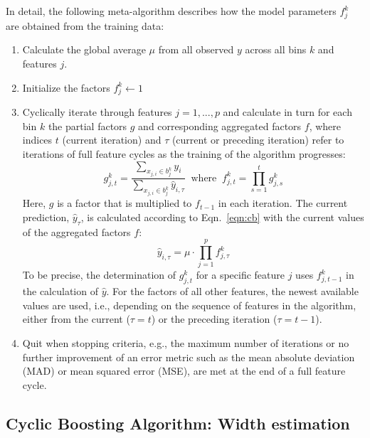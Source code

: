 \documentclass[BCOR=1mm, DIV=calc,10pt,
twoside=true,
twocolumn,
headings=normal]{scrartcl}
\newcommand{\eqn}{Eqn.~}
\begin{document}
In detail, the following meta-algorithm describes how the model parameters $f^k_j$ are obtained from the training data:
\begin{enumerate}
\item{Calculate the global average $\mu$ from all observed $y$ across all bins $k$ and features $j$.}
\item{Initialize the factors $f^k_j \leftarrow 1$}
\item{Cyclically iterate through features $j = 1,...,p $ and calculate in turn for each bin $k$ the partial factors $g$ and corresponding aggregated factors $f$, where indices $t$ (current iteration) and $\tau$ (current or preceding iteration) refer to iterations of full feature cycles as the training of the algorithm progresses:
\begin{equation} \label{factors}
g^k_{j,t} = \frac{\sum \limits_{x_{j,i} \in b^k_j} y_i}{\sum \limits_{x_{j,i} \in b^k_j} \hat{y}_{i,\tau}}\;\; \mathrm{where} \; \; f^k_{j,t} = \prod \limits_{s=1}^t g^k_{j,s}
\end{equation}
Here,  $g$ is a factor that is multiplied to $f_{t-1}$ in each iteration. The current prediction, $\hat{y}_\tau$, is calculated according to \eqn \eqref{eqn:cb} with the current values of the aggregated factors $f$:
\begin{equation} \label{factors3}
\hat{y}_{i,\tau} = \mu \cdot \prod \limits_{j=1}^p f^k_{j,\tau}
\end{equation}
To be precise, the determination of $g^k_{j,t}$ for a specific feature $j$ uses $f^k_{j,t-1}$ in the calculation of $\hat{y}$. For the factors of all other features, the newest available values are used, i.e., depending on the sequence of features in the algorithm, either from the current ($\tau=t$) or the preceding iteration ($\tau=t-1$).}
\item{Quit when stopping criteria, e.g., the maximum number of iterations or no further improvement of an error metric such as the mean absolute deviation (MAD) or mean squared error (MSE), are met at the end of a full feature cycle.}
\end{enumerate}

\subsection{Cyclic Boosting Algorithm: Width estimation}
\label{sec:cb_width}
\end{document}
